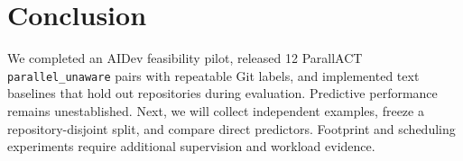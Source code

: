 \documentclass[sigconf,authorversion,nonacm]{acmart}
\begin{document}
\section{Conclusion}
We completed an AIDev feasibility pilot, released 12 ParallACT \texttt{parallel\_unaware} pairs with repeatable Git labels, and implemented text baselines that hold out repositories during evaluation. Predictive performance remains unestablished. Next, we will collect independent examples, freeze a repository-disjoint split, and compare direct predictors. Footprint and scheduling experiments require additional supervision and workload evidence.



\end{document}
